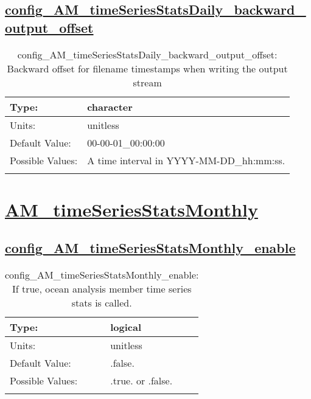 \subsection[config\_AM\_timeSeriesStatsDaily\_backward\_output\_offset]{\hyperref[sec:nm_tab_AM_timeSeriesStatsDaily]{config\_AM\_timeSeriesStatsDaily\_backward\_output\_offset}}
\label{subsec:nm_sec_config_AM_timeSeriesStatsDaily_backward_output_offset}
\begin{center}
\begin{longtable}{| p{2.0in} || p{4.0in} |}
    \hline
    Type: & character \\
    \hline
    Units: & \si{unitless} \\
    \hline
    Default Value: & 00-00-01\_00:00:00 \\
    \hline
    Possible Values: & A time interval in YYYY-MM-DD\_hh:mm:ss. \\
    \hline
    \caption{config\_AM\_timeSeriesStatsDaily\_backward\_output\_offset: Backward offset for filename timestamps when writing the output stream}
\end{longtable}
\end{center}
\section[AM\_timeSeriesStatsMonthly]{\hyperref[sec:nm_tab_AM_timeSeriesStatsMonthly]{AM\_timeSeriesStatsMonthly}}
\label{sec:nm_sec_AM_timeSeriesStatsMonthly}
\subsection[config\_AM\_timeSeriesStatsMonthly\_enable]{\hyperref[sec:nm_tab_AM_timeSeriesStatsMonthly]{config\_AM\_timeSeriesStatsMonthly\_enable}}
\label{subsec:nm_sec_config_AM_timeSeriesStatsMonthly_enable}
\begin{center}
\begin{longtable}{| p{2.0in} || p{4.0in} |}
    \hline
    Type: & logical \\
    \hline
    Units: & \si{unitless} \\
    \hline
    Default Value: & .false. \\
    \hline
    Possible Values: & .true. or .false. \\
    \hline
    \caption{config\_AM\_timeSeriesStatsMonthly\_enable: If true, ocean analysis member time series stats is called.}
\end{longtable}
\end{center}
